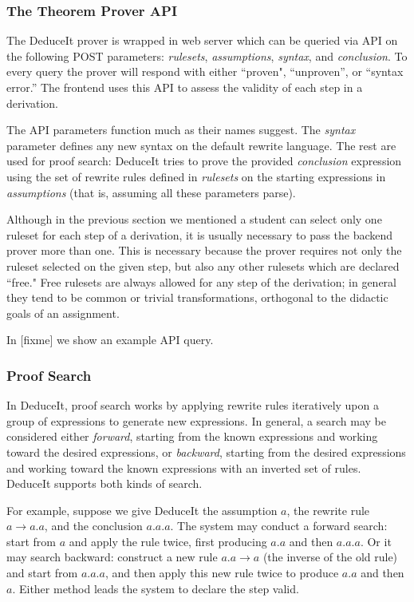 \documentclass{sigchi}
\begin{document}
\subsubsection{The Theorem Prover API}

The DeduceIt prover is wrapped in web server which can be queried via API on the following POST parameters: \textit{rulesets}, \textit{assumptions}, \textit{syntax}, and \textit{conclusion}. To every query the prover will respond with either ``proven", ``unproven'', or ``syntax error.'' The frontend uses this API to assess the validity of each step in a derivation.

The API parameters function much as their names suggest. The \textit{syntax} parameter defines any new syntax on the default rewrite language. The rest are used for proof search: DeduceIt tries to prove the provided \textit{conclusion} expression using the set of rewrite rules defined in \textit{rulesets} on the starting expressions in \textit{assumptions} (that is, assuming all these parameters parse). 

Although in the previous section we mentioned a student can select only one ruleset for each step of a derivation, it is usually necessary to pass the backend prover more than one. This is necessary because the prover requires not only the ruleset selected on the given step, but also any other rulesets which are declared ``free." Free rulesets are always allowed for any step of the derivation; in general they tend to be common or trivial transformations, orthogonal to the didactic goals of an assignment. 

In [fixme] we show an example API query.

\subsubsection{Proof Search}

In DeduceIt, proof search works by applying rewrite rules iteratively upon a group of expressions to generate new expressions. In general, a search may be considered either \textit{forward}, starting from the known expressions and working toward the desired expressions, or \textit{backward}, starting from the desired expressions and working toward the known expressions with an inverted set of rules. DeduceIt supports both kinds of search. 

For example, suppose we give DeduceIt the assumption $a$, the rewrite rule $a \rightarrow a.a$, and the conclusion $a.a.a$. The system may conduct a forward search: start from $a$ and apply the rule twice, first producing $a.a$ and then $a.a.a$. Or it may search backward: construct a new rule $a.a \rightarrow a$ (the inverse of the old rule) and start from $a.a.a$, and then apply this new rule twice to produce $a.a$ and then $a$. Either method leads the system to declare the step valid.
\end{document}
